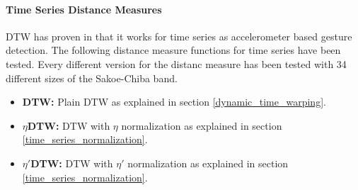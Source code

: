 \paragraph{Time Series Distance Measures} \label{time_series_distance_measures}
DTW has proven in \cite{liu2009uwave} that it works for time series as accelerometer based gesture detection. The
following distance measure functions for time series have been tested. Every different version for the distanc measure
has been tested with 34 different sizes of the Sakoe-Chiba band.

\begin{itemize}
    \item \textbf{DTW:} Plain DTW as explained in section \ref{dynamic_time_warping}.
    \item \textbf{$\eta$DTW:} DTW with $\eta$ normalization as explained in section \ref{time_series_normalization}.
    \item \textbf{$\eta '$DTW:} DTW with $\eta '$ normalization as explained in section \ref{time_series_normalization}.
\end{itemize}
